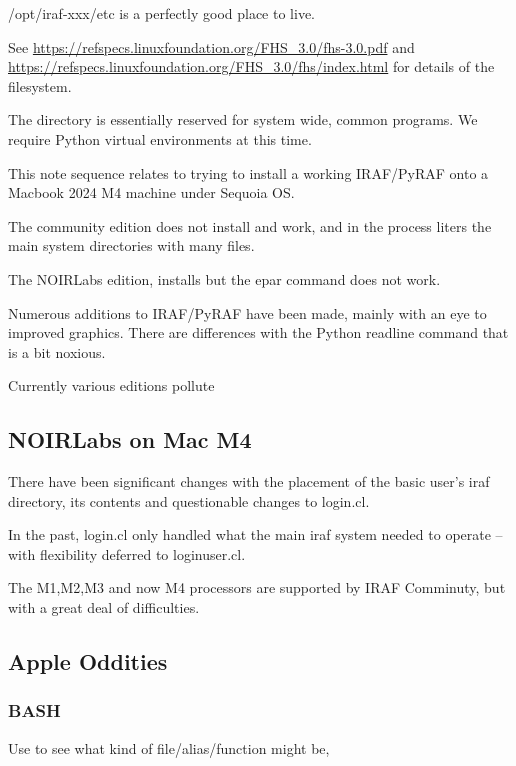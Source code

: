 /opt/iraf-xxx/etc is a perfectly good place to live.

See \url{https://refspecs.linuxfoundation.org/FHS_3.0/fhs-3.0.pdf} and
\url{https://refspecs.linuxfoundation.org/FHS_3.0/fhs/index.html} for
details of the filesystem.

The  directory is essentially reserved for system wide,
common programs. We require Python virtual environments at this time.



This note sequence relates to trying to install a working IRAF/PyRAF onto 
a Macbook 2024 M4 machine under Sequoia OS. 

The community edition does not install and work, and in the process liters
the main system directories with many files. 

The NOIRLabs edition, installs but the epar command does not work.

Numerous additions to IRAF/PyRAF have been made, mainly with an eye to
improved graphics. There are differences with the Python readline command
that is a bit noxious.

Currently various editions pollute 

\subsection{NOIRLabs on Mac M4}

There have been significant changes with the placement of  the basic
user's iraf directory, its contents and questionable changes to login.cl.





In the past, login.cl only handled what the main iraf system needed
to operate -- with flexibility deferred to loginuser.cl.

The M1,M2,M3 and now M4 processors are supported by IRAF Comminuty, but with a 
great deal of difficulties.


\subsection{Apple Oddities}


\subsubsection{BASH}

Use  to see what kind of file/alias/function
 might be,

